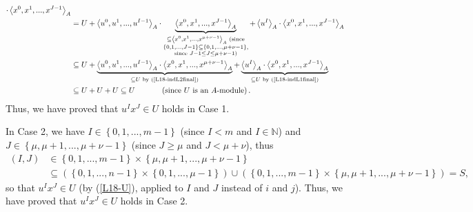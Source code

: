 \documentclass[12pt,final,notitlepage,onecolumn]{article}%
\begin{document}
\begin{align*}
{\cdot\left\langle x^{0},x^{1},...,x^{J-1}\right\rangle _{A}}\\
&  =U+\left\langle u^{0},u^{1},...,u^{I-1}\right\rangle _{A}\cdot
\underbrace{\left\langle x^{0},x^{1},...,x^{J-1}\right\rangle _{A}%
}_{\substack{\subseteq\left\langle x^{0},x^{1},...,x^{\mu+\nu-1}\right\rangle
_{A}\text{ (since}\\\left\{  0,1,...,J-1\right\}  \subseteq\left\{
0,1,...,\mu+\nu-1\right\}  \text{,}\\\text{since }J-1\leq J\leq\mu
+\nu-1\text{)}}}+\left\langle u^{I}\right\rangle _{A}\cdot\left\langle
x^{0},x^{1},...,x^{J-1}\right\rangle _{A}\\
&  \subseteq U+\underbrace{\left\langle u^{0},u^{1},...,u^{I-1}\right\rangle
_{A}\cdot\left\langle x^{0},x^{1},...,x^{\mu+\nu-1}\right\rangle _{A}%
}_{\subseteq U\text{ by (\ref{L18-indL2final})}}+\underbrace{\left\langle
u^{I}\right\rangle _{A}\cdot\left\langle x^{0},x^{1},...,x^{J-1}\right\rangle
_{A}}_{\subseteq U\text{ by (\ref{L18-indL1final})}}\\
&  \subseteq U+U+U\subseteq U\ \ \ \ \ \ \ \ \ \ \left(  \text{since }U\text{
is an }A\text{-module}\right)  .
\end{align*}
Thus, we have proved that $u^{I}x^{J}\in U$ holds in Case 1.

In Case 2, we have $I\in\left\{  0,1,...,m-1\right\}  $ (since $I<m$ and
$I\in\mathbb{N}$) and $J\in\left\{  \mu,\mu+1,...,\mu+\nu-1\right\}  $ (since
$J\geq\mu$ and $J<\mu+\nu$), thus%
\begin{align*}
\left(  I,J\right)   &  \in\left\{  0,1,...,m-1\right\}  \times\left\{
\mu,\mu+1,...,\mu+\nu-1\right\} \\
&  \subseteq\left(  \left\{  0,1,...,n-1\right\}  \times\left\{
0,1,...,\mu-1\right\}  \right)  \cup\left(  \left\{  0,1,...,m-1\right\}
\times\left\{  \mu,\mu+1,...,\mu+\nu-1\right\}  \right)  =S,
\end{align*}
so that $u^{I}x^{J}\in U$ (by (\ref{L18-U}), applied to $I$ and $J$ instead of
$i$ and $j$). Thus, we have proved that $u^{I}x^{J}\in U$ holds in Case 2.
\end{document}
